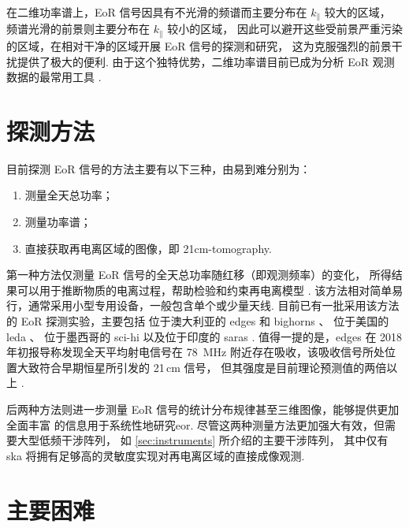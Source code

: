 在二维功率谱上，EoR 信号因具有不光滑的频谱而主要分布在 $k_{\parallel}$ 较大的区域，
频谱光滑的前景则主要分布在 $k_{\parallel}$ 较小的区域，
因此可以避开这些受前景严重污染的区域，在相对干净的区域开展 EoR 信号的探测和研究，
这为克服强烈的前景干扰提供了极大的便利.
由于这个独特优势，二维功率谱目前已成为分析 EoR 观测数据的最常用工具
\cite{trott2012,thyagarajan2013,barry2016,beardsley2016,trott2016,patil2017}.


\section{探测方法}
\label{sec:det-methods}

目前探测 EoR 信号的方法主要有以下三种，由易到难分别为：
\begin{enumerate}
  \item 测量全天总功率；
  \item 测量功率谱；
  \item 直接获取再电离区域的图像，即 \ac{21cm-tomography}.
\end{enumerate}

第一种方法仅测量 EoR 信号的全天总功率随红移（即观测频率）的变化，
所得结果可以用于推断物质的电离过程，帮助检验和约束再电离模型
\cite{pritchard2012,liu2016}.
该方法相对简单易行，通常采用小型专用设备，一般包含单个或少量天线.
目前已有一批采用该方法的 EoR 探测实验，主要包括
位于澳大利亚的 \ac{edges} \cite{bowman2008} 和
\ac{bighorns} \cite{sokolowski2015}、
位于美国的 \ac{leda} \cite{greenhill2012}、
位于墨西哥的 \ac{sci-hi} \cite{voytek2014}
以及位于印度的 \ac{saras} \cite{singh2018}.
值得一提的是，\acs{edges} 在 2018 年初报导称发现全天平均射电信号在 \SI{78}{\MHz}
附近存在吸收，该吸收信号所处位置大致符合早期恒星所引发的 21\,cm 信号，
但其强度是目前理论预测值的两倍以上 \cite{bowman2018}.

后两种方法则进一步测量 EoR 信号的统计分布规律甚至三维图像，能够提供更加全面丰富
的信息用于系统性地研究\acl{eor}.
尽管这两种测量方法更加强大有效，但需要大型低频干涉阵列，
如 \autoref{sec:instruments} 所介绍的主要干涉阵列，
其中仅有 \acs{ska} 将拥有足够高的灵敏度实现对再电离区域的直接成像观测.


\section{主要困难}
\label{sec:det-difficulties}

